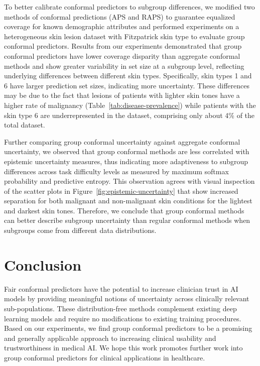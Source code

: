 \documentclass[letterpaper]{article} %
\begin{document}
    To better calibrate conformal predictors to subgroup differences, we modified two methods of conformal predictions (APS and RAPS) to guarantee equalized coverage for known demographic attributes and performed experiments on a heterogeneous skin lesion dataset with Fitzpatrick skin type to evaluate group conformal predictors.
    Results from our experiments demonstrated that group conformal predictors have lower coverage disparity than aggregate conformal methods and show greater variability in set size at a subgroup level, reflecting underlying differences between different skin types.
    Specifically, skin types 1 and 6 have larger prediction set sizes, indicating more uncertainty.
    These differences may be due to the fact that lesions of patients with lighter skin tones have a higher rate of malignancy (Table~\ref{tab:disease-prevalence}) while patients with the skin type 6 are underrepresented in the dataset, comprising only about 4\% of the total dataset.


    Further comparing group conformal uncertainty against aggregate conformal uncertainty, we observed that group conformal methods are less correlated with epistemic uncertainty measures, thus indicating more adaptiveness to subgroup differences across task difficulty levels as measured by maximum softmax probability and predictive entropy.
    This observation agrees with visual inspection of the scatter plots in Figure~\ref{fig:epistemic-uncertainty} that show increased separation for both malignant and non-malignant skin conditions for the lightest and darkest skin tones.
    Therefore, we conclude that group conformal methods can better describe subgroup uncertainty than regular conformal methods when subgroups come from different data distributions.

\section{Conclusion}
    Fair conformal predictors have the potential to increase clinician trust in AI models by providing meaningful notions of uncertainty across clinically relevant sub-populations.
    These distribution-free methods complement existing deep learning models and require no modifications to existing training procedures.
    Based on our experiments, we find group conformal predictors to be a promising and generally applicable approach to increasing clinical usability and trustworthiness in medical AI.
    We hope this work promotes further work into group conformal predictors for clinical applications in healthcare.
\end{document}
